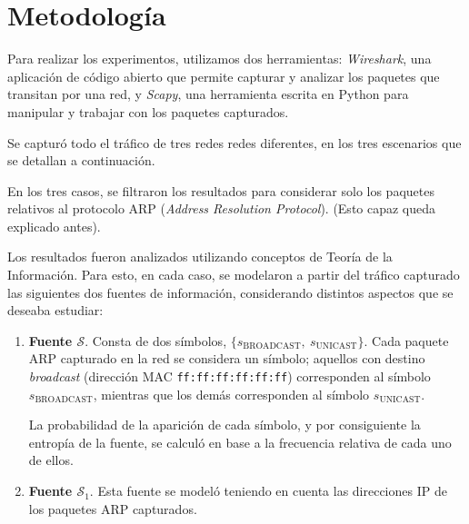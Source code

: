 \section{Metodología}

Para realizar los experimentos, utilizamos dos herramientas: \emph{Wireshark},
una aplicación de código abierto que permite capturar y analizar los paquetes
que transitan por una red, y \emph{Scapy}, una herramienta escrita en
Python para manipular y trabajar con los paquetes capturados.

Se capturó todo el tráfico de tres redes redes diferentes, en los tres
escenarios que se detallan a continuación.


En los tres casos, se filtraron los resultados para considerar solo los
paquetes relativos al protocolo ARP (\emph{Address Resolution Protocol}).
(Esto capaz queda explicado antes).

Los resultados fueron analizados utilizando conceptos de Teoría de la
Información. Para esto, en cada caso, se modelaron a partir del tráfico
capturado las siguientes dos fuentes de información, considerando distintos
aspectos que se deseaba estudiar:

\begin{enumerate}
    \item \textbf{Fuente $\mathcal{S}$}. Consta de dos símbolos, $\lbrace
    s_{\text{BROADCAST}},\ s_{\text{UNICAST}} \rbrace$. Cada paquete ARP
    capturado en la red se considera un símbolo; aquellos con destino
    \emph{broadcast} (dirección MAC \texttt{ff:ff:ff:ff:ff:ff}) corresponden
    al símbolo $s_{\text{BROADCAST}}$, mientras que los demás corresponden
    al símbolo $s_{\text{UNICAST}}$.

    La probabilidad de la aparición de cada símbolo, y por consiguiente
    la entropía de la fuente, se calculó en base a la frecuencia relativa
    de cada uno de ellos.
    \item \textbf{Fuente $\mathcal{S}_1$}. Esta fuente se modeló teniendo en
    cuenta las direcciones IP de los paquetes ARP capturados.
\end{enumerate}